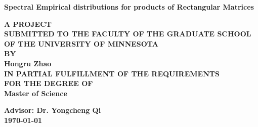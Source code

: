 \documentclass[12pt]{article}
\theoremstyle{plain}
\theoremstyle{definition}
\theoremstyle{remark}
\begin{document}
\begin{titlepage}
   \begin{center}
       \vspace*{1cm}
 
       \textbf{Spectral Empirical distributions for products of Rectangular Matrices}
 
       \vspace{0.5cm}
        
 
       \vspace{1.5cm}
 
       \textbf{A PROJECT \\ SUBMITTED TO THE FACULTY OF THE GRADUATE SCHOOL\\ OF THE UNIVERSITY OF MINNESOTA\\ BY }\\
        \vspace{1 cm}
        \textbf{Hongru Zhao}\\
       
       \vspace{1cm}
       \textbf{IN PARTIAL FULFILLMENT OF THE REQUIREMENTS\\ FOR THE DEGREE OF\\ Master of Science} 
       \vspace{1 cm}
       
       \vspace{1 cm}
       \textbf{Advisor: Dr. Yongcheng Qi}
       \\
        \vspace{1 cm}
        \textbf{\today}
   \end{center}
\end{titlepage}




\end{document}
